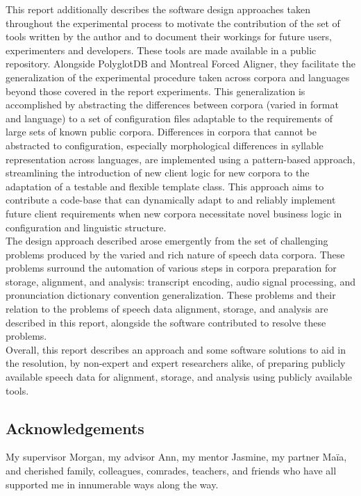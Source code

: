 \documentclass[11pt]{article}
\begin{document}
This report additionally describes the software design approaches taken throughout the experimental process to motivate the contribution of the set of tools written by the author and to document their workings for future users, experimenters and developers. These tools are made available in a public repository. Alongside PolyglotDB and Montreal Forced Aligner, they facilitate the generalization of the experimental procedure taken across corpora and languages beyond those covered in the report experiments. This generalization is accomplished by abstracting the differences between corpora (varied in format and language) to a set of configuration files adaptable to the requirements of large sets of known public corpora. Differences in corpora that cannot be abstracted to configuration, especially morphological differences in syllable representation across languages, are implemented using a pattern-based approach, streamlining the introduction of new client logic for new corpora to the adaptation of a testable and flexible template class. This approach aims to contribute a code-base that can dynamically adapt to and reliably implement future client requirements when new corpora necessitate novel business logic in configuration and linguistic structure. \\

The design approach described arose emergently from the set of challenging problems produced by the varied and rich nature of speech data corpora. These problems surround the automation of various steps in corpora preparation for storage, alignment, and analysis: transcript encoding, audio signal processing, and pronunciation dictionary convention generalization. These problems and their relation to the problems of speech data alignment, storage, and analysis are described in this report, alongside the software contributed to resolve these problems. \\

Overall, this report describes an approach and some software solutions to aid in the resolution, by non-expert and expert researchers alike, of preparing publicly available speech data for alignment, storage, and analysis using publicly available tools. \\

\subsection{Acknowledgements}

My supervisor Morgan, my advisor Ann, my mentor Jasmine, my partner Ma\"ia, and cherished family, colleagues, comrades, teachers, and friends who have all supported me in innumerable ways along the way.
\end{document}
